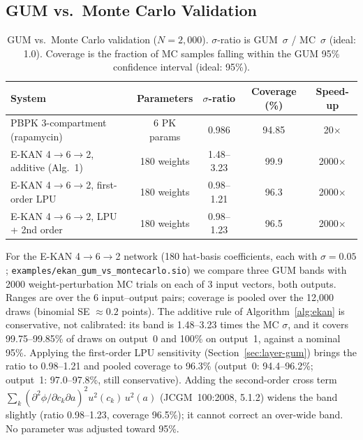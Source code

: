 \documentclass{article}
\begin{document}
\subsection{GUM vs.\ Monte Carlo Validation}
\label{sec:gum-mc}


\begin{table}[t]
\centering
\caption{GUM vs.\ Monte Carlo validation ($N=2{,}000$).  $\sigma$-ratio is
GUM~$\sigma$ / MC~$\sigma$ (ideal: 1.0).  Coverage is the fraction of MC
samples falling within the GUM 95\% confidence interval (ideal: 95\%).}
\label{tab:gum-mc}
\begin{tabular}{@{}lcccc@{}}
\toprule
\textbf{System} & \textbf{Parameters} & \textbf{$\sigma$-ratio} &
  \textbf{Coverage (\%)} & \textbf{Speed-up} \\
\midrule
PBPK 3-compartment (rapamycin) & 6 PK params & 0.986 & 94.85 & 20$\times$ \\
E-KAN 4$\to$6$\to$2, additive (Alg.~1) & 180 weights & 1.48--3.23 & 99.9 & 2000$\times$ \\
E-KAN 4$\to$6$\to$2, first-order LPU    & 180 weights & 0.98--1.21 & 96.3 & 2000$\times$ \\
E-KAN 4$\to$6$\to$2, LPU + 2nd order    & 180 weights & 0.98--1.23 & 96.5 & 2000$\times$ \\
\bottomrule
\end{tabular}
\end{table}

%
For the E-KAN 4$\to$6$\to$2 network (180 hat-basis coefficients, each
with $\sigma=0.05$; \texttt{examples/ekan\_gum\_vs\_montecarlo.sio}) we
compare three GUM bands with 2000 weight-perturbation MC trials on each of 3
input vectors, both outputs.  Ranges are over the 6 input--output pairs;
coverage is pooled over the 12{,}000 draws (binomial SE $\approx 0.2$
points).  The additive rule of Algorithm~\ref{alg:ekan} is conservative,
not calibrated: its band is 1.48--3.23 times the MC $\sigma$, and it covers
99.75--99.85\% of draws on output~0 and 100\% on output~1, against a
nominal 95\%.  Applying the first-order LPU sensitivity
(Section~\ref{sec:layer-gum}) brings the ratio to 0.98--1.21 and pooled
coverage to 96.3\% (output~0: 94.4--96.2\%; output~1: 97.0--97.8\%, still
conservative).  Adding the second-order cross term
$\sum_k (\partial^2\phi/\partial c_k \partial a)^2 u^2(c_k)\,u^2(a)$
(JCGM~100:2008, 5.1.2) widens the band slightly (ratio 0.98--1.23,
coverage 96.5\%); it cannot correct an over-wide band.  No parameter was
adjusted toward 95\%.
\end{document}
